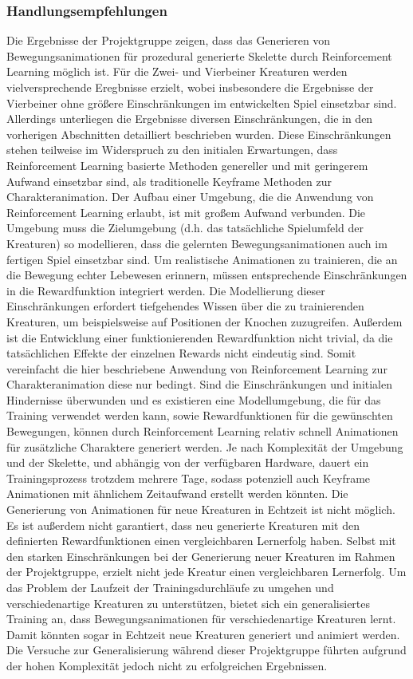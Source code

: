 \subsubsection{Handlungsempfehlungen}
Die Ergebnisse der Projektgruppe zeigen, dass das Generieren von Bewegungsanimationen für prozedural generierte Skelette durch Reinforcement Learning möglich ist. Für die Zwei- und Vierbeiner Kreaturen werden vielversprechende Eregbnisse erzielt, wobei insbesondere die Ergebnisse der Vierbeiner ohne größere Einschränkungen im entwickelten Spiel einsetzbar sind.
Allerdings unterliegen die Ergebnisse diversen Einschränkungen, die in den vorherigen Abschnitten detailliert beschrieben wurden. Diese Einschränkungen stehen teilweise im Widerspruch zu den initialen Erwartungen, dass Reinforcement Learning basierte Methoden genereller und mit geringerem Aufwand einsetzbar sind, als traditionelle Keyframe Methoden zur Charakteranimation. Der Aufbau einer Umgebung, die die Anwendung von Reinforcement Learning erlaubt, ist mit großem Aufwand verbunden. Die Umgebung muss die Zielumgebung (d.h. das tatsächliche Spielumfeld der Kreaturen) so modellieren, dass die gelernten Bewegungsanimationen auch im fertigen Spiel einsetzbar sind. Um realistische Animationen zu trainieren, die an die Bewegung echter Lebewesen erinnern, müssen entsprechende Einschränkungen in die Rewardfunktion integriert werden. Die Modellierung dieser Einschränkungen erfordert tiefgehendes Wissen über die zu trainierenden Kreaturen, um beispielsweise auf Positionen der Knochen zuzugreifen. Außerdem ist die Entwicklung einer funktionierenden Rewardfunktion nicht trivial, da die tatsächlichen Effekte der einzelnen Rewards nicht eindeutig sind. Somit vereinfacht die hier beschriebene Anwendung von Reinforcement Learning zur Charakteranimation diese nur bedingt.
Sind die Einschränkungen und initialen Hindernisse überwunden und es existieren eine Modellumgebung, die für das Training verwendet werden kann, sowie Rewardfunktionen für die gewünschten Bewegungen, können durch Reinforcement Learning relativ schnell Animationen für zusätzliche Charaktere generiert werden. Je nach Komplexität der Umgebung und der Skelette, und abhängig von der verfügbaren Hardware, dauert ein Trainingsprozess trotzdem mehrere Tage, sodass potenziell auch Keyframe Animationen mit ähnlichem Zeitaufwand erstellt werden könnten. Die Generierung von Animationen für neue Kreaturen in Echtzeit ist nicht möglich. Es ist außerdem nicht garantiert, dass neu generierte Kreaturen mit den definierten Rewardfunktionen einen vergleichbaren Lernerfolg haben. Selbst mit den starken Einschränkungen bei der Generierung neuer Kreaturen im Rahmen der Projektgruppe, erzielt nicht jede Kreatur einen vergleichbaren Lernerfolg. Um das Problem der Laufzeit der Trainingsdurchläufe zu umgehen und verschiedenartige Kreaturen zu unterstützen, bietet sich ein generalisiertes Training an, dass Bewegungsanimationen für verschiedenartige Kreaturen lernt. Damit könnten sogar in Echtzeit neue Kreaturen generiert und animiert werden. Die Versuche zur Generalisierung während dieser Projektgruppe führten aufgrund der hohen Komplexität jedoch nicht zu erfolgreichen Ergebnissen.

